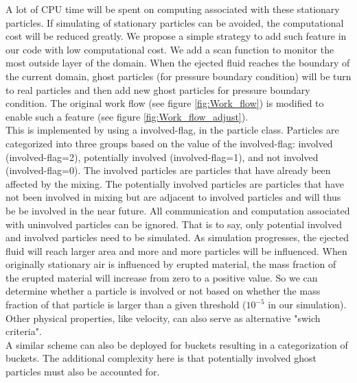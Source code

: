 \documentclass[conference,compsoc]{IEEEtran}
\begin{document}
A lot of CPU time will be spent on computing associated with these stationary particles.  If simulating of stationary particles can be avoided, the computational cost will be reduced greatly. %
We propose a simple strategy to add such feature in our code with low computational cost. We add a scan function to monitor the most outside layer of the domain. When the ejected fluid reaches the boundary of the current domain, ghost particles (for pressure boundary condition) will be turn to real particles and then add new ghost particles for pressure boundary condition. The original work flow (see figure \ref{fig:Work_flow}) is modified to enable such a feature (see figure \ref{fig:Work_flow_adjust}).\\
This is implemented by using a involved-flag, in the particle class. Particles are categorized into three groups based on the value of the involved-flag: involved (involved-flag=2), potentially involved (involved-flag=1), and not involved (involved-flag=0). The involved particles are particles that have already been affected by the mixing. The potentially involved particles are particles that have not been involved in mixing but are adjacent to involved particles and will thus be be involved in the near future. %
All communication and computation associated with uninvolved particles can be ignored. That is to say, only potential involved and involved particles need to be simulated.
As simulation progresses, the ejected fluid will reach larger area and more and more particles will be influenced. When originally stationary air is influenced by erupted material, the mass fraction of the erupted material will increase from zero to a positive value. So we can determine whether a particle is involved or not based on whether the mass fraction of that particle is larger than a given threshold ($10^{-5} $ in our simulation). Other physical properties, like velocity, can also serve as alternative "swich criteria".\\
A similar scheme can also be deployed for buckets resulting in a categorization  of buckets. The additional complexity here is that potentially involved ghost particles must also be accounted for.
\end{document}
